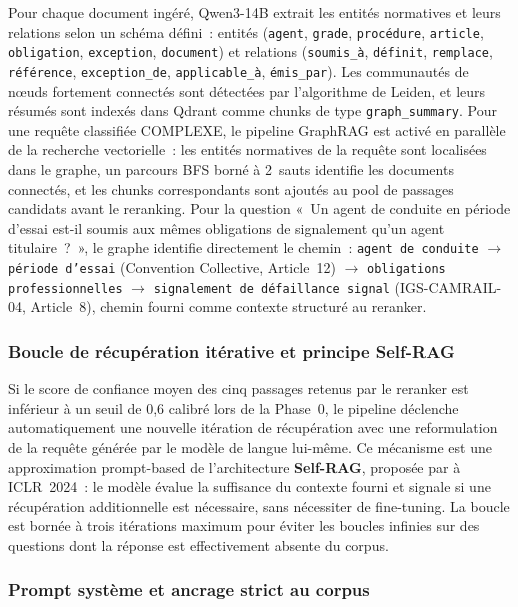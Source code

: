 \documentclass[12pt,a4paper]{report}
\begin{document}
Pour chaque document ingéré, Qwen3-14B extrait les entités normatives et leurs relations selon
un schéma défini~: entités (\texttt{agent}, \texttt{grade}, \texttt{procédure}, \texttt{article},
\texttt{obligation}, \texttt{exception}, \texttt{document}) et relations (\texttt{soumis\_à},
\texttt{définit}, \texttt{remplace}, \texttt{référence}, \texttt{exception\_de},
\texttt{applicable\_à}, \texttt{émis\_par}). Les communautés de nœuds fortement connectés sont
détectées par l'algorithme de Leiden, et leurs résumés sont indexés dans Qdrant comme chunks de
type \texttt{graph\_summary}. Pour une requête classifiée COMPLEXE, le pipeline GraphRAG est
activé en parallèle de la recherche vectorielle~: les entités normatives de la requête sont
localisées dans le graphe, un parcours BFS borné à 2~sauts identifie les documents connectés,
et les chunks correspondants sont ajoutés au pool de passages candidats avant le reranking.
Pour la question «~Un agent de conduite en période d'essai est-il soumis aux mêmes obligations
de signalement qu'un agent titulaire~?~», le graphe identifie directement le chemin~:
\texttt{agent de conduite} $\to$ \texttt{période d'essai} (Convention Collective, Article~12)
$\to$ \texttt{obligations professionnelles} $\to$ \texttt{signalement de défaillance signal}
(IGS-CAMRAIL-04, Article~8), chemin fourni comme contexte structuré au reranker.

\subsubsection*{Boucle de récupération itérative et principe Self-RAG}

Si le score de confiance moyen des cinq passages retenus par le reranker est inférieur à un
seuil de 0,6 calibré lors de la Phase~0, le pipeline déclenche automatiquement une nouvelle
itération de récupération avec une reformulation de la requête générée par le modèle de langue
lui-même. Ce mécanisme est une approximation prompt-based de l'architecture \textbf{Self-RAG},
proposée par \textcite{Asai2024} à ICLR~2024~: le modèle évalue la suffisance du contexte fourni
et signale si une récupération additionnelle est nécessaire, sans nécessiter de fine-tuning.
La boucle est bornée à trois itérations maximum pour éviter les boucles infinies sur des
questions dont la réponse est effectivement absente du corpus.

\subsubsection*{Prompt système et ancrage strict au corpus}
\end{document}
